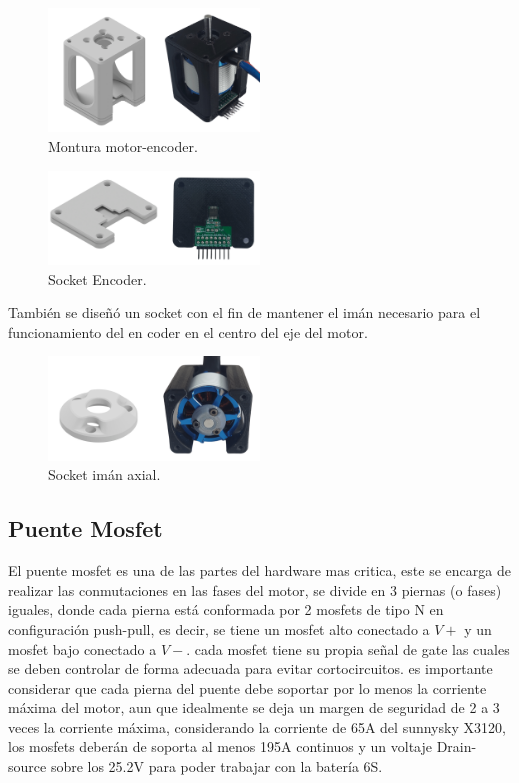 \documentclass[11pt]{report}
\begin{document}
\begin{figure}[ht]
	\centering
	\includegraphics[width=0.5\textwidth]{imagenes/Motor/conjunto.png}
	\caption{Montura motor-encoder.}
	\label{fig:Montura}
\end{figure}
\FloatBarrier

\begin{figure}[ht]
	\centering
	\includegraphics[width=0.5\textwidth]{imagenes/Motor/encoder.png}
	\caption{Socket Encoder.}
	\label{fig:encoder}
\end{figure}
\FloatBarrier

También se diseñó un socket con el fin de mantener el imán necesario para el funcionamiento del en coder en el centro del eje del motor.

\begin{figure}[ht]
	\centering
	\includegraphics[width=0.5\textwidth]{imagenes/Motor/iman.png}
	\caption{Socket imán axial.}
	\label{fig:iman}
\end{figure}
\FloatBarrier

\newpage
\subsection{Puente Mosfet}

El puente mosfet es una de las partes del hardware mas critica, este se encarga de realizar las conmutaciones en las fases del motor, se divide en 3 piernas (o fases) iguales, donde cada pierna está conformada por 2 mosfets de tipo N en configuración push-pull, es decir, se tiene un mosfet alto conectado a $V+$ y un mosfet bajo conectado a $V-$. cada mosfet tiene su propia señal de gate las cuales se deben controlar de forma adecuada para evitar cortocircuitos. es importante considerar que cada pierna del puente debe soportar por lo menos la corriente máxima del motor, aun que idealmente se deja un margen de seguridad de 2 a 3 veces la corriente máxima, considerando la corriente de 65A del sunnysky X3120, los mosfets deberán de soporta al menos 195A continuos y un voltaje Drain-source sobre los 25.2V para poder trabajar con la batería 6S.
\end{document}

